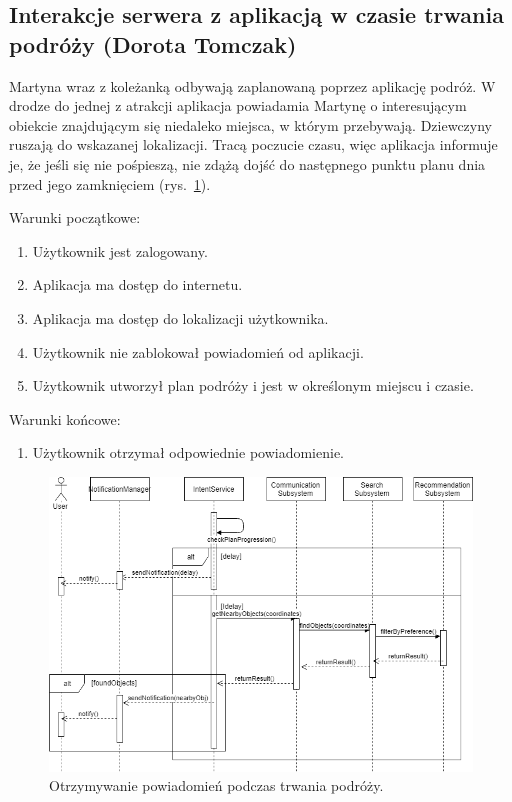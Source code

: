 \documentclass[10pt,twoside,a4paper]{report}
\begin{document}
\subsection{Interakcje serwera z aplikacją w czasie trwania podróży (Dorota Tomczak)}
\par Martyna wraz z koleżanką odbywają zaplanowaną poprzez aplikację podróż. W drodze do jednej z atrakcji aplikacja powiadamia Martynę o interesującym obiekcie znajdującym się niedaleko miejsca, w którym przebywają. Dziewczyny ruszają do wskazanej lokalizacji. Tracą poczucie czasu, więc aplikacja informuje je, że jeśli się nie pośpieszą, nie zdążą dojść do następnego punktu planu dnia przed jego zamknięciem (rys.~\ref{fig:whileTravelling}).

\noindent\newline Warunki początkowe:
\begin{enumerate}
  \item Użytkownik jest zalogowany.
  \item Aplikacja ma dostęp do internetu.
  \item Aplikacja ma dostęp do lokalizacji użytkownika.
  \item Użytkownik nie zablokował powiadomień od aplikacji.
  \item Użytkownik utworzył plan podróży i jest w określonym miejscu i czasie.
\end{enumerate}
\par
\noindent\newline
Warunki końcowe:
\begin{enumerate}
  \item Użytkownik otrzymał odpowiednie powiadomienie.
\end{enumerate}

\noindent\newline
\begin{figure}[h]
\centering
\includegraphics[width=\linewidth]{whileTravelling}
\caption{Otrzymywanie powiadomień podczas trwania podróży.}
\label{fig:whileTravelling}
\end{figure}
\FloatBarrier
\end{document}
